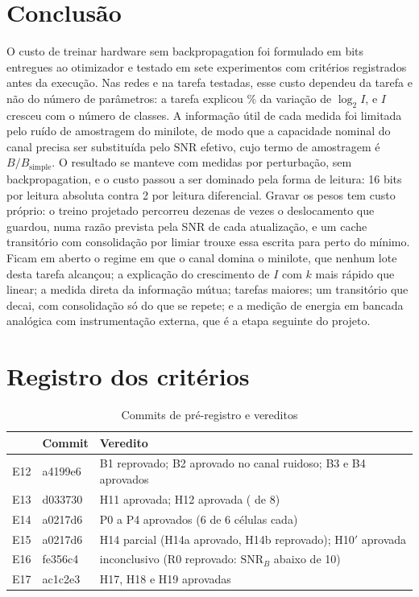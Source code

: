 \documentclass[journal]{IEEEtran}
\newcommand{\SNR}{\mathrm{SNR}}
\begin{document}
\section{Conclusão}

O custo de treinar hardware sem backpropagation foi formulado em bits entregues ao otimizador e testado em sete experimentos com critérios registrados antes da execução. Nas redes e na tarefa testadas, esse custo dependeu da tarefa e não do número de parâmetros: a tarefa explicou \EtrezeTarefa\% da variação de $\log_2 I$, e $I$ cresceu com o número de classes. A informação útil de cada medida foi limitada pelo ruído de amostragem do minilote, de modo que a capacidade nominal do canal precisa ser substituída pelo $\SNR$ efetivo, cujo termo de amostragem é $B/B_{\text{simple}}$. O resultado se manteve com medidas por perturbação, sem backpropagation, e o custo passou a ser dominado pela forma de leitura: 16 bits por leitura absoluta contra 2 por leitura diferencial. Gravar os pesos tem custo próprio: o treino projetado percorreu dezenas de vezes o deslocamento que guardou, numa razão prevista pela SNR de cada atualização, e um cache transitório com consolidação por limiar trouxe essa escrita para perto do mínimo. Ficam em aberto o regime em que o canal domina o minilote, que nenhum lote desta tarefa alcançou; a explicação do crescimento de $I$ com $k$ mais rápido que linear; a medida direta da informação mútua; tarefas maiores; um transitório que decai, com consolidação só do que se repete; e a medição de energia em bancada analógica com instrumentação externa, que é a etapa seguinte do projeto.

\appendices
\section{Registro dos critérios}

\begin{table}[H]
\centering
\caption{Commits de pré-registro e vereditos}
\label{tab:registro}
\begin{tabular}{llp{}}
\toprule
& Commit & Veredito \\
\midrule
E12 & a4199e6 & B1 reprovado; B2 aprovado no canal ruidoso; B3 e B4 aprovados \\
E13 & d033730 & H11 aprovada; H12 aprovada (\EtrezeHdoze{} de 8) \\
E14 & a0217d6 & P0 a P4 aprovados (6 de 6 células cada) \\
E15 & a0217d6 & H14 parcial (H14a aprovado, H14b reprovado); H10$'$ aprovada \\
E16 & fe356c4 & inconclusivo (R0 reprovado: $\SNR_B$ abaixo de 10) \\
E17 & ac1c2e3 & H17, H18 e H19 aprovadas \\
\bottomrule
\end{tabular}
\end{table}
\end{document}
